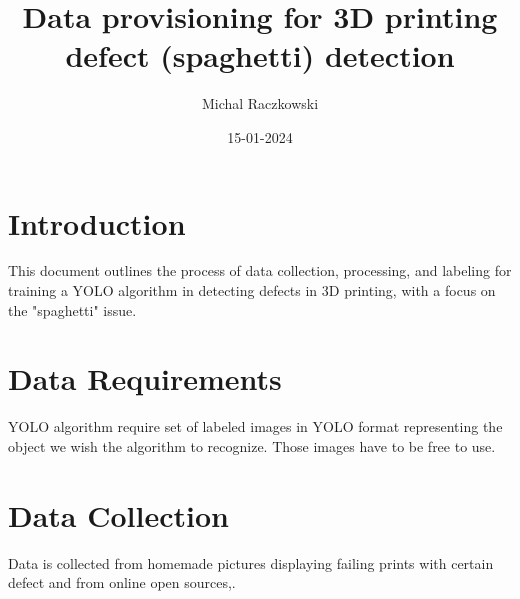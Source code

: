 \documentclass[12pt,a4paper]{article}
\title{\textbf{Data provisioning for 3D printing defect (spaghetti) detection }}
\author{Michal Raczkowski}
\date{15-01-2024}
\begin{document}
\maketitle
\thispagestyle{empty} %

\newpage
\tableofcontents
\newpage

\setcounter{page}{1} %

\section{Introduction}
This document outlines the process of data collection, processing, and labeling for training a YOLO algorithm in detecting defects in 3D printing, with a focus on the "spaghetti" issue.

\section{Data Requirements}
YOLO algorithm require set of labeled images in YOLO format representing the object we wish the algorithm to recognize. Those images have to be free to use.

\section{Data Collection}
Data is collected from homemade pictures displaying failing prints with certain defect and from online open sources\cite{onlineOpenSource1},\cite{onlineOpenSource2}.
\end{document}
